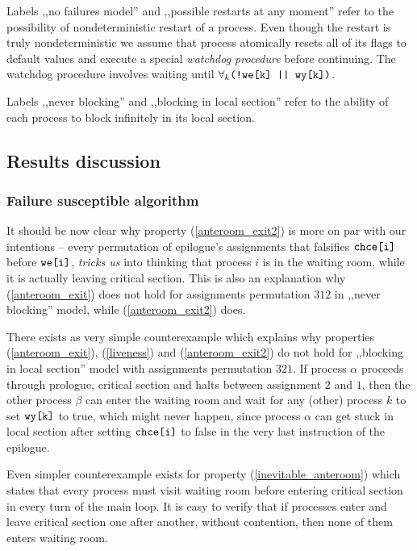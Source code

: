 Labels ,,no failures model'' and ,,possible restarts at any moment'' refer to the possibility of nondeterministic restart of a process.
Even though the restart is truly nondeterministic we assume that process atomically resets all of its flags to default values and execute a special \emph{watchdog procedure} before continuing.
The watchdog procedure involves waiting until $\forall_k \verb+(!we[k] || wy[k])+$.

Labels ,,never blocking'' and ,,blocking in local section'' refer to the ability of each process to block infinitely in its local section.

\subsection*{Results discussion}

\subsubsection*{Failure susceptible algorithm}

It should be now clear why property (\ref{anteroom_exit2}) is more on par with our intentions -- every permutation of epilogue's assignments that falsifies $\verb+chce[i]+$ before $\verb+we[i]+$, \emph{tricks us} into thinking that process $i$ is in the waiting room, while it is actually leaving critical section.
This is also an explanation why (\ref{anteroom_exit}) does not hold for assignments permutation $312$ in ,,never blocking'' model, while (\ref{anteroom_exit2}) does.

There exists as very simple counterexample which explains why properties (\ref{anteroom_exit}), (\ref{liveness}) and (\ref{anteroom_exit2}) do not hold for ,,blocking in local section'' model with assignments permutation $321$.
If process $\alpha$ proceeds through prologue, critical section and halts between assignment $2$ and $1$, then the other process $\beta$ can enter the waiting room and wait for any (other) process $k$ to set $\verb+wy[k]+$ to true, which might never happen, since process $\alpha$ can get stuck in local section after setting $\verb+chce[i]+$ to false in the very last instruction of the epilogue.

Even simpler counterexample exists for property (\ref{inevitable_anteroom}) which states that every process must visit waiting room before entering critical section in every turn of the main loop.
It is easy to verify that if processes enter and leave critical section one after another, without contention, then none of them enters waiting room.

